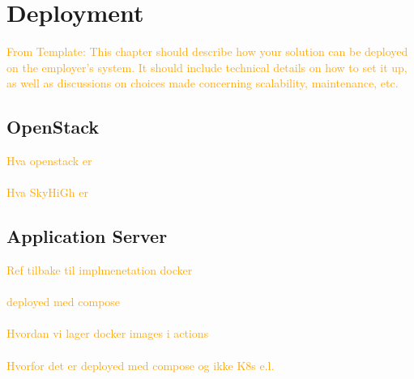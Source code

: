 \chapter{Deployment}\label{chap:deployment}

\textcolor{orange}{From Template: This chapter should describe how your solution can be deployed on the employer's system. It should include technical details on how to set it up, as well as discussions on choices made concerning scalability, maintenance, etc.}

\section{OpenStack}\label{sec:openstack}

\textcolor{orange}{
Hva openstack er \\ \\
Hva SkyHiGh er
}

\section{Application Server}\label{sec:applicationserver}

\textcolor{orange}{
Ref tilbake til implmenetation docker \\ \\
deployed med compose \\ \\
Hvordan vi lager docker images i actions \\ \\
Hvorfor det er deployed med compose og ikke K8s e.l. 
}
